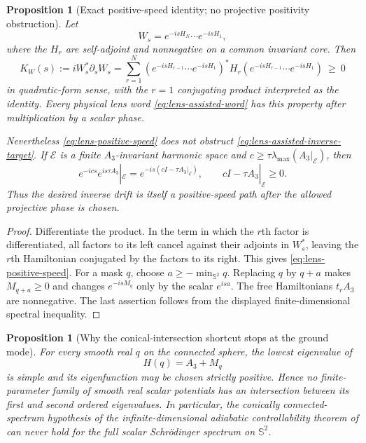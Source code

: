 \documentclass[11pt]{article}
\newtheorem{proposition}[theorem]{Proposition}
\theoremstyle{remark}
\begin{document}
\begin{proposition}[Exact positive-speed identity; no projective positivity
obstruction]
\label{prop:lens-positive-speed}
Let
\[
 W_s=e^{-isH_N}\cdots e^{-isH_1},
\]
where the $H_r$ are self-adjoint and nonnegative on a common invariant core.
Then
\begin{equation}
 K_W(s):=iW_s^*\partial_sW_s
 =\sum_{r=1}^N
   (e^{-isH_{r-1}}\cdots e^{-isH_1})^*
   H_r
   (e^{-isH_{r-1}}\cdots e^{-isH_1})
 \ \geq\ 0
 \label{eq:lens-positive-speed}
\end{equation}
in quadratic-form sense, with the $r=1$ conjugating product interpreted as
the identity.  Every physical lens word
\eqref{eq:lens-assisted-word} has this property after multiplication by a
scalar phase.

Nevertheless \eqref{eq:lens-positive-speed} does not obstruct
\eqref{eq:lens-assisted-inverse-target}.  If $\mathcal E$ is a finite
$A_3$-invariant harmonic space and
$c\geq\tau\lambda_{\max}(A_3|_{\mathcal E})$, then
\[
 e^{-ics}e^{is\tau A_3}|_{\mathcal E}
 =e^{-is(cI-\tau A_3|_{\mathcal E})},
 \qquad cI-\tau A_3|_{\mathcal E}\geq0.
\]
Thus the desired inverse drift is itself a positive-speed path after the
allowed projective phase is chosen.
\end{proposition}

\begin{proof}
Differentiate the product.  In the term in which the $r$th factor is
differentiated, all factors to its left cancel against their adjoints in
$W_s^*$, leaving the $r$th Hamiltonian conjugated by the factors to its
right.  This gives \eqref{eq:lens-positive-speed}.  For a mask $q$, choose
$a\geq-\min_{\mathbb S^2}q$.  Replacing $q$ by $q+a$ makes
$M_{q+a}\geq0$ and changes $e^{-isM_q}$ only by the scalar $e^{isa}$.
The free Hamiltonians $t_rA_3$ are nonnegative.  The last assertion follows
from the displayed finite-dimensional spectral inequality.
\end{proof}

\begin{proposition}[Why the conical-intersection shortcut stops at the
ground mode]
\label{prop:scalar-ground-conical-no-go}
For every smooth real $q$ on the connected sphere, the lowest eigenvalue of
\[
 H(q)=A_3+M_q
\]
is simple and its eigenfunction may be chosen strictly positive.  Hence no
finite-parameter family of smooth real scalar potentials has an intersection
between its first and second ordered eigenvalues.  In particular, the
conically connected-spectrum hypothesis of the infinite-dimensional
adiabatic controllability theorem of
\cite{BoscainGauthierRossiSigalotti2015} can never hold for the full scalar
Schr\"odinger spectrum on $\mathbb S^2$.
\end{proposition}
\end{document}
